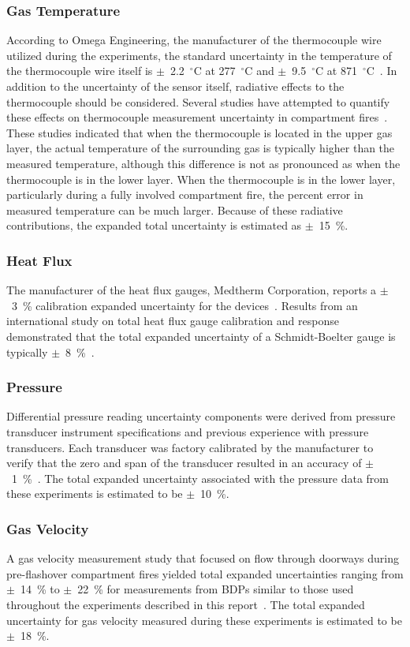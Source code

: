 \documentclass[12pt,oneside]{book}
\begin{document}
\subsubsection*{Gas Temperature}
According to Omega Engineering, the manufacturer of the thermocouple wire utilized during the experiments, the standard uncertainty in the temperature of the thermocouple wire itself is $\pm$~2.2~$^\circ$C at 277~$^\circ$C and $\pm$~9.5~$^\circ$C at 871~$^\circ$C~\cite{Omega:2004}. In addition to the uncertainty of the sensor itself, radiative effects to the thermocouple should be considered. Several studies have attempted to quantify these effects on thermocouple measurement uncertainty in compartment fires~\cite{Blevins:1999,Pitts:2003}. These studies indicated that when the thermocouple is located in the upper gas layer, the actual temperature of the surrounding gas is typically higher than the measured temperature, although this difference is not as pronounced as when the thermocouple is in the lower layer. When the thermocouple is in the lower layer, particularly during a fully involved compartment fire, the percent error in measured temperature can be much larger. Because of these radiative contributions, the expanded total uncertainty is estimated as $\pm$~15~\%.

\subsubsection*{Heat Flux}
The manufacturer of the heat flux gauges, Medtherm Corporation, reports a $\pm$~3~\% calibration expanded uncertainty for the devices~\cite{Medtherm:2003}. Results from an international study on total heat flux gauge calibration and response demonstrated that the total expanded uncertainty of a Schmidt-Boelter gauge is typically $\pm$~8~\%~\cite{Pitts:2006}.

\subsubsection*{Pressure}
Differential pressure reading uncertainty components were derived from pressure transducer instrument specifications and previous experience with pressure transducers. Each transducer was factory calibrated by the manufacturer to verify that the zero and span of the transducer resulted in an accuracy of $\pm$~1~\%~\cite{Setra:2002}. The total expanded uncertainty associated with the pressure data from these experiments is estimated to be $\pm$~10~\%.

\subsubsection*{Gas Velocity}
A gas velocity measurement study that focused on flow through doorways during pre-flashover compartment fires yielded total expanded uncertainties ranging from $\pm$~14~\% to $\pm$~22~\% for measurements from BDPs similar to those used throughout the experiments described in this report~\cite{Bryant:FSJ2009}. The total expanded uncertainty for gas velocity measured during these experiments is estimated to be $\pm$~18~\%.
\end{document}
